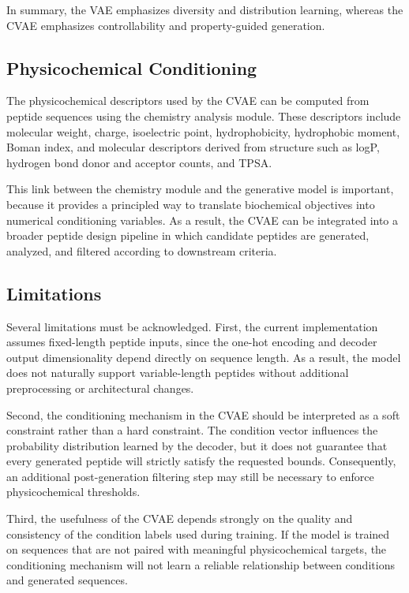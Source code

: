 In summary, the VAE emphasizes diversity and distribution learning, whereas the CVAE emphasizes controllability and property-guided generation.

\subsection{Physicochemical Conditioning}

The physicochemical descriptors used by the CVAE can be computed from peptide sequences using the chemistry analysis module. These descriptors include molecular weight, charge, isoelectric point, hydrophobicity, hydrophobic moment, Boman index, and molecular descriptors derived from structure such as logP, hydrogen bond donor and acceptor counts, and TPSA.

This link between the chemistry module and the generative model is important, because it provides a principled way to translate biochemical objectives into numerical conditioning variables. As a result, the CVAE can be integrated into a broader peptide design pipeline in which candidate peptides are generated, analyzed, and filtered according to downstream criteria.

\subsection{Limitations}

Several limitations must be acknowledged. First, the current implementation assumes fixed-length peptide inputs, since the one-hot encoding and decoder output dimensionality depend directly on sequence length. As a result, the model does not naturally support variable-length peptides without additional preprocessing or architectural changes.

Second, the conditioning mechanism in the CVAE should be interpreted as a soft constraint rather than a hard constraint. The condition vector influences the probability distribution learned by the decoder, but it does not guarantee that every generated peptide will strictly satisfy the requested bounds. Consequently, an additional post-generation filtering step may still be necessary to enforce physicochemical thresholds.

Third, the usefulness of the CVAE depends strongly on the quality and consistency of the condition labels used during training. If the model is trained on sequences that are not paired with meaningful physicochemical targets, the conditioning mechanism will not learn a reliable relationship between conditions and generated sequences.

